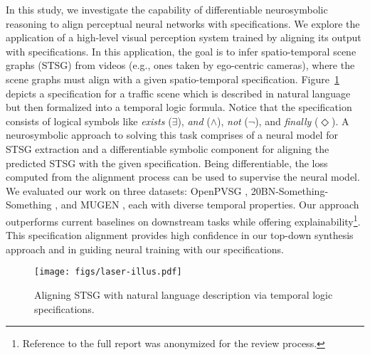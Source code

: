 In this study, we investigate the capability of differentiable neurosymbolic reasoning to align perceptual neural networks with specifications.
We explore the application of a high-level visual perception system trained by aligning its output with specifications.
In this application, the goal is to infer spatio-temporal scene graphs (STSG) from videos (e.g., ones taken by ego-centric cameras), where the scene graphs must align with a given spatio-temporal specification.
Figure~\ref{fig:laser-illus} depicts a specification for a traffic scene which is described in natural language but then formalized into a temporal logic formula.
Notice that the specification consists of logical symbols like \textit{exists} ($\exists$), \textit{and} ($\wedge$), \textit{not} ($\neg$), and \textit{finally} ($\Diamond$).
A neurosymbolic approach to solving this task comprises of a neural model for STSG extraction and a differentiable symbolic component for aligning the predicted STSG with the given specification.
Being differentiable, the loss computed from the alignment process can be used to supervise the neural model.
We evaluated our work on three datasets: OpenPVSG \cite{yang2023panoptic}, 20BN-Something-Something \cite{goyal2017something}, and MUGEN \cite{hayes2022mugen}, each with diverse temporal properties. Our approach outperforms current baselines on downstream tasks while offering explainability\footnote{Reference to the full report was anonymized for the review process.}.
This specification alignment provides high confidence in our top-down synthesis approach and in guiding neural training with our specifications.

\begin{figure}
    \centering
    \texttt{[image: figs/laser-illus.pdf]}
    \caption{Aligning STSG with natural language description via temporal logic specifications.}
    \label{fig:laser-illus}
\end{figure}

